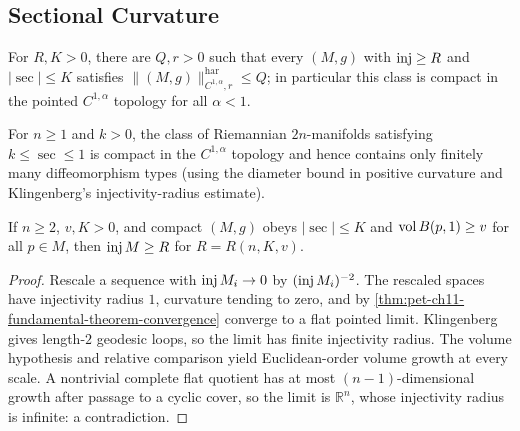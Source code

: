 \subsection{Sectional Curvature}

\begin{theorem}
  \label{thm:pet-ch11-convergence-theorem-riemannian-geometry}
  For $R,K>0$, there are $Q,r>0$ such that every $(M,g)$ with $\operatorname{inj}\ge R$
  and $|\sec|\le K$ satisfies
  $\|(M,g)\|^{\mathrm{har}}_{C^{1,\alpha},r}\le Q$; in
  particular this class is compact in the pointed $C^{1,\alpha}$ topology for
  all $\alpha<1$.
\end{theorem}

\begin{corollary}
  \label{cor:pet-ch11-cheeger-even-dim-finiteness}
  For $n\ge1$ and $k>0$, the class of Riemannian $2n$-manifolds satisfying
  $k\le\sec\le1$ is compact in the $C^{1,\alpha}$ topology and hence contains
  only finitely many diffeomorphism types (using the diameter bound in
  positive curvature and Klingenberg's injectivity-radius estimate).
\end{corollary}

\begin{lemma}
  \label{lem:pet-ch11-cheeger-injectivity-radius-lemma}
  If $n\ge2$, $v,K>0$, and compact $(M,g)$ obeys
  $|\sec|\le K$ and $\operatorname{vol} B(p,1)\ge v$ for all $p\in M$, then $\operatorname{inj} M\ge R$
  for $R=R(n,K,v)$.
\end{lemma}
\begin{proof}
  \sketch
  Rescale a sequence with \(\operatorname{inj} M_i\to0\) by \((\operatorname{inj} M_i)^{-2}\). The rescaled spaces have injectivity radius \(1\), curvature tending to zero, and by \cref{thm:pet-ch11-fundamental-theorem-convergence} converge to a flat pointed limit. Klingenberg gives length-\(2\) geodesic loops, so the limit has finite injectivity radius. The volume hypothesis and relative comparison yield Euclidean-order volume growth at every scale. A nontrivial complete flat quotient has at most \((n-1)\)-dimensional growth after passage to a cyclic cover, so the limit is \(\mathbb R^n\), whose injectivity radius is infinite: a contradiction.
\end{proof}


